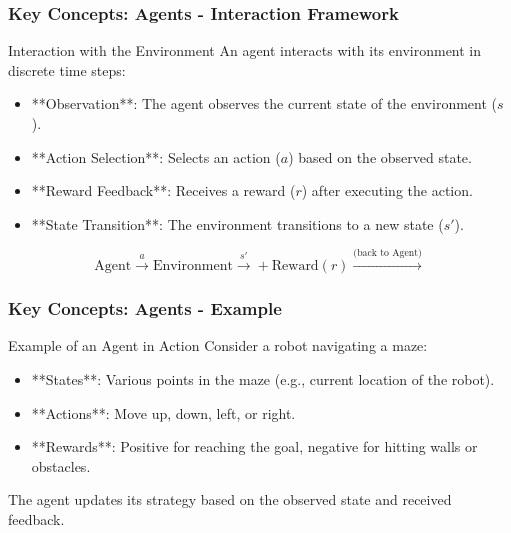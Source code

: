 \documentclass{beamer}
\begin{document}
\begin{frame}[fragile]
    \frametitle{Key Concepts: Agents - Interaction Framework}
    \begin{block}{Interaction with the Environment}
        An agent interacts with its environment in discrete time steps:
        \begin{itemize}
            \item **Observation**: The agent observes the current state of the environment ($s$).
            \item **Action Selection**: Selects an action ($a$) based on the observed state.
            \item **Reward Feedback**: Receives a reward ($r$) after executing the action.
            \item **State Transition**: The environment transitions to a new state ($s'$).
        \end{itemize}
        \begin{equation}
            \text{Agent} \xrightarrow{a} \text{Environment} \xrightarrow{s'} + \text{Reward}(r) \xrightarrow{\text{(back to Agent)}}
        \end{equation}
    \end{block}
\end{frame}

\begin{frame}[fragile]
    \frametitle{Key Concepts: Agents - Example}
    \begin{block}{Example of an Agent in Action}
        Consider a robot navigating a maze:
        \begin{itemize}
            \item **States**: Various points in the maze (e.g., current location of the robot).
            \item **Actions**: Move up, down, left, or right.
            \item **Rewards**: Positive for reaching the goal, negative for hitting walls or obstacles.
        \end{itemize}
        The agent updates its strategy based on the observed state and received feedback.
    \end{block}
\end{frame}
\end{document}
